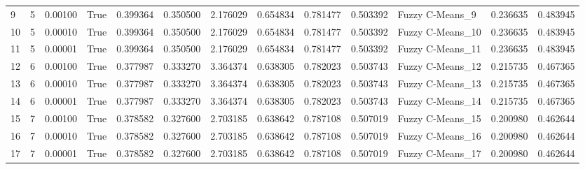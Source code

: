 \begin{tabular}{llrlrrrrrrlrr}
9  &          5 &    0.00100 &  True &             0.399364 &            0.350500 &              2.176029 &               0.654834 &           0.781477 &           0.503392 &   Fuzzy C-Means\_9 &          0.236635 &         0.483945 \\
10 &          5 &    0.00010 &  True &             0.399364 &            0.350500 &              2.176029 &               0.654834 &           0.781477 &           0.503392 &  Fuzzy C-Means\_10 &          0.236635 &         0.483945 \\
11 &          5 &    0.00001 &  True &             0.399364 &            0.350500 &              2.176029 &               0.654834 &           0.781477 &           0.503392 &  Fuzzy C-Means\_11 &          0.236635 &         0.483945 \\
12 &          6 &    0.00100 &  True &             0.377987 &            0.333270 &              3.364374 &               0.638305 &           0.782023 &           0.503743 &  Fuzzy C-Means\_12 &          0.215735 &         0.467365 \\
13 &          6 &    0.00010 &  True &             0.377987 &            0.333270 &              3.364374 &               0.638305 &           0.782023 &           0.503743 &  Fuzzy C-Means\_13 &          0.215735 &         0.467365 \\
14 &          6 &    0.00001 &  True &             0.377987 &            0.333270 &              3.364374 &               0.638305 &           0.782023 &           0.503743 &  Fuzzy C-Means\_14 &          0.215735 &         0.467365 \\
15 &          7 &    0.00100 &  True &             0.378582 &            0.327600 &              2.703185 &               0.638642 &           0.787108 &           0.507019 &  Fuzzy C-Means\_15 &          0.200980 &         0.462644 \\
16 &          7 &    0.00010 &  True &             0.378582 &            0.327600 &              2.703185 &               0.638642 &           0.787108 &           0.507019 &  Fuzzy C-Means\_16 &          0.200980 &         0.462644 \\
17 &          7 &    0.00001 &  True &             0.378582 &            0.327600 &              2.703185 &               0.638642 &           0.787108 &           0.507019 &  Fuzzy C-Means\_17 &          0.200980 &         0.462644 \\
\bottomrule
\end{tabular}
